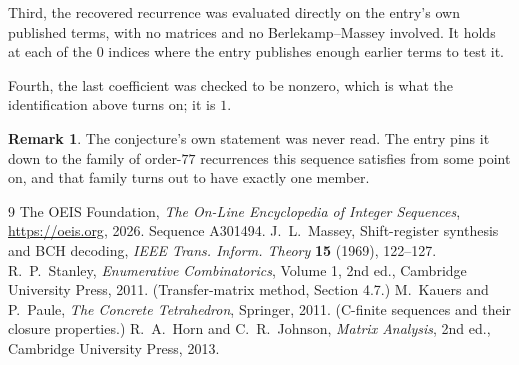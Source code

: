 \documentclass[11pt,a4paper]{article}
\theoremstyle{plain}
\theoremstyle{definition}
\newtheorem{remark}[theorem]{Remark}
\begin{document}
Third, the recovered recurrence was evaluated directly on the entry's own published terms, with
no matrices and no Berlekamp--Massey involved. It holds at each of the $0$ indices where
the entry publishes enough earlier terms to test it.

Fourth, the last coefficient was checked to be nonzero, which is what the identification above
turns on; it is $1$.

\begin{remark}
The conjecture's own statement was never read. The entry pins it down to the family of
order-$77$ recurrences this sequence satisfies from some point on, and that family turns
out to have exactly one member.
\end{remark}

\begin{thebibliography}{9}
 The OEIS Foundation, \emph{The On-Line Encyclopedia of Integer
Sequences}, \url{https://oeis.org}, 2026. Sequence A301494.
 J.~L.~Massey, Shift-register synthesis and BCH decoding, \emph{IEEE
Trans. Inform. Theory} \textbf{15} (1969), 122--127.
 R.~P.~Stanley, \emph{Enumerative Combinatorics}, Volume 1, 2nd ed.,
Cambridge University Press, 2011. (Transfer-matrix method, Section 4.7.)
 M.~Kauers and P.~Paule, \emph{The Concrete Tetrahedron}, Springer, 2011.
(C-finite sequences and their closure properties.)
 R.~A.~Horn and C.~R.~Johnson, \emph{Matrix Analysis}, 2nd ed., Cambridge
University Press, 2013.
\end{thebibliography}
\end{document}
